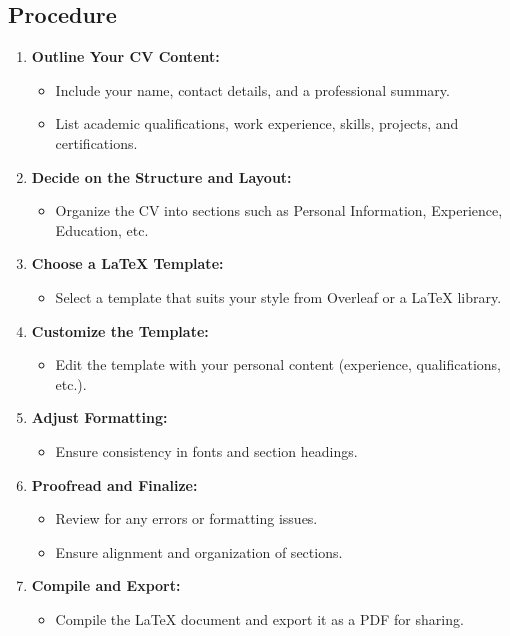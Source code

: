 \documentclass[a4paper,12pt]{article}
\begin{document}
\subsection*{Procedure}
\begin{enumerate}[label=\arabic*.]
    \item \textbf{Outline Your CV Content:}
    \begin{itemize}
        \item Include your name, contact details, and a professional summary.
        \item List academic qualifications, work experience, skills, projects, and certifications.
    \end{itemize}

    \item \textbf{Decide on the Structure and Layout:}
    \begin{itemize}
        \item Organize the CV into sections such as Personal Information, Experience, Education, etc.
    \end{itemize}

    \item \textbf{Choose a LaTeX Template:}
    \begin{itemize}
        \item Select a template that suits your style from Overleaf or a LaTeX library.
    \end{itemize}

    \item \textbf{Customize the Template:}
    \begin{itemize}
        \item Edit the template with your personal content (experience, qualifications, etc.).
    \end{itemize}

    \item \textbf{Adjust Formatting:}
    \begin{itemize}
        \item Ensure consistency in fonts and section headings.
    \end{itemize}

    \item \textbf{Proofread and Finalize:}
    \begin{itemize}
        \item Review for any errors or formatting issues.
        \item Ensure alignment and organization of sections.
    \end{itemize}

    \item \textbf{Compile and Export:}
    \begin{itemize}
        \item Compile the LaTeX document and export it as a PDF for sharing.
    \end{itemize}
\end{enumerate}
\end{document}
